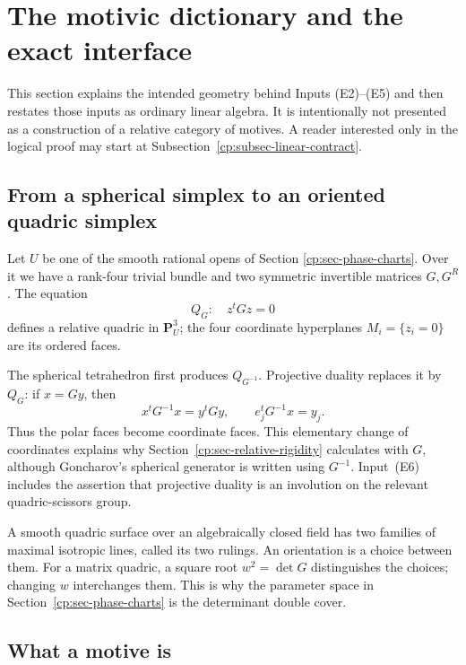 \section{The motivic dictionary and the exact interface}
\label{cp:sec-motivic-dictionary}

This section explains the intended geometry behind Inputs
\textup{(E2)--(E5)} and then restates those inputs as ordinary linear
algebra.  It is intentionally not presented as a construction of a relative
category of motives.  A reader interested only in the logical proof may
start at Subsection~\ref{cp:subsec-linear-contract}.

\subsection{From a spherical simplex to an oriented quadric simplex}
\label{cp:subsec-quadric-simplex}

Let \(U\) be one of the smooth rational opens of Section
\ref{cp:sec-phase-charts}.  Over it we have a rank-four trivial bundle and
two symmetric invertible matrices \(G,G^R\).  The equation
\[
 Q_G:\quad z^tGz=0
\]
defines a relative quadric in \(\mathbf P^3_U\); the four coordinate
hyperplanes \(M_i=\{z_i=0\}\) are its ordered faces.

The spherical tetrahedron first produces \(Q_{G^{-1}}\).  Projective
duality replaces it by \(Q_G\): if \(x=Gy\), then
\[
 x^tG^{-1}x=y^tGy,
 \qquad e_j^tG^{-1}x=y_j.
\]
Thus the polar faces become coordinate faces.  This elementary change of
coordinates explains why Section~\ref{cp:sec-relative-rigidity} calculates
with \(G\), although Goncharov's spherical generator is written using
\(G^{-1}\).  Input~\textup{(E6)} includes the assertion that projective
duality is an involution on the relevant quadric-scissors group.

A smooth quadric surface over an algebraically closed field has two
families of maximal isotropic lines, called its two rulings.  An orientation
is a choice between them.  For a matrix quadric, a square root
\(w^2=\det G\) distinguishes the choices; changing \(w\) interchanges them.
This is why the parameter space in Section~\ref{cp:sec-phase-charts} is the
determinant double cover.

\subsection{What a motive is}
\label{cp:subsec-what-is-a-motive}

